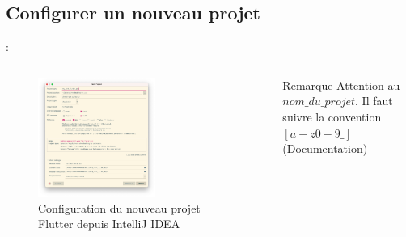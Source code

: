 \documentclass[10pt]{beamer}
\begin{document}
\subsection{Configurer un nouveau projet}
\begin{frame}[fragile,t]{\secname : \subsecname}
    \begin{columns}
        \begin{figure}[H]
            \begin{center}
                \includegraphics[width=0.6\textwidth]{../assets/img/new-project-2.jpg}
                \caption*{Configuration du nouveau projet Flutter depuis IntelliJ IDEA}
                \label{Fig:new-project-2}
            \end{center}
        \end{figure}
        \begin{block}{Remarque}
            Attention au $nom\_du\_projet$. Il faut suivre la convention $[a-z0-9\_]$ (\href{https://dart.dev/tools/pub/pubspec#name}{Documentation})
        \end{block}
    \end{columns}
\end{frame}
\end{document}
